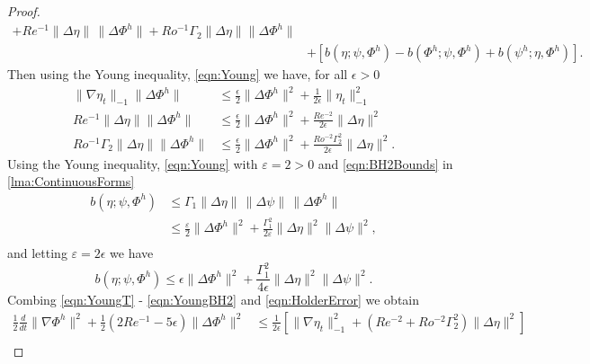 \begin{proof}
\begin{equation}
\begin{split}
        + Re^{-1}\|\Delta \eta\|\, \|\Delta \Phi^h\|
        + Ro^{-1} \Gamma_2 \|\Delta \eta\| \|\Delta \Phi^h\| \\
      & + \left[ b(\eta;\psi,\Phi^h) - b(\Phi^h;\psi,\Phi^h)
        + b(\psi^h;\eta,\Phi^h)\right].
    \end{split}
    \label{eqn:HolderError}
  \end{equation}
  Then using the Young inequality, \eqref{eqn:Young} we have, for all $\epsilon>0$
  \begin{align}
    \|\nabla \eta_t\|_{-1} \|\Delta \Phi^h\|
      &\le \frac{\epsilon}{2} \|\Delta \Phi^h\|^2
      + \frac{1}{2 \epsilon} \|\eta_t\|_{-1}^2 \label{eqn:YoungT} \\
    Re^{-1} \|\Delta \eta\| \|\Delta \Phi^h\|
      &\le \frac{\epsilon}{2} \|\Delta \Phi^h\|^2
      + \frac{Re^{-2}}{2 \epsilon} \|\Delta \eta\|^2 \label{eqn:YoungLaplace} \\
    Ro^{-1} \Gamma_2 \|\Delta \eta\| \|\Delta \Phi^h\|
      &\le \frac{\epsilon}{2} \|\Delta \Phi^h\|^2
      + \frac{Ro^{-2} \Gamma_2^2}{2 \epsilon} \|\Delta \eta\|^2. \label{eqn:YoungBeta}
  \end{align}
  Using the Young inequality, \eqref{eqn:Young} with $\varepsilon = 2 > 0$ and
  \autoref{eqn:BH2Bounds} in \autoref{lma:ContinuousForms}
  \begin{align*}
    b(\eta;\psi,\Phi^h) &\le \Gamma_1 \|\Delta \eta\|\,\|\Delta \psi\|\, \|\Delta \Phi^h\| \\
    &\le \frac{\varepsilon}{2} \|\Delta \Phi^h\|^2
      + \frac{\Gamma_1^2}{2 \varepsilon} \|\Delta \eta\|^2 \|\Delta \psi\|^2, \\
  \end{align*}
  and letting $\varepsilon = 2 \epsilon$ we have
  \begin{equation}
    b(\eta; \psi, \Phi^h) \le \epsilon \|\Delta \Phi^h\|^2
      + \frac{\Gamma_1^2}{4 \epsilon} \|\Delta \eta\|^2 \|\Delta \psi\|^2.
      \label{eqn:YoungBH2}
  \end{equation}
  Combing \eqref{eqn:YoungT} - \eqref{eqn:YoungBH2} and \eqref{eqn:HolderError}
  we obtain
  \begin{equation}
    \begin{split}
    \frac{1}{2} \frac{d}{dt} \|\nabla \Phi^h\|^2 + \frac{1}{2}\left(2Re^{-1} -
      5 \epsilon \right)\|\Delta \Phi^h\|^2
      &\le \frac{1}{2 \epsilon}\left[\|\nabla \eta_t\|_{-1}^2
      + \left( Re^{-2} + Ro^{-2} \Gamma_2^2 \right) \|\Delta \eta\|^2\right] \\

\end{split}
\end{equation}
\end{proof}
